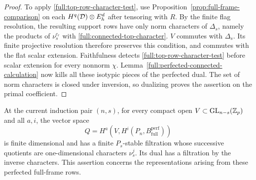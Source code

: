 \begin{proof}
To apply \eqref{full:top-row-character-test}, use
Proposition~\ref{prop:full-frame-comparison} on each
$H^q(\mathcal D)\otimes E_h^d$ after tensoring with $R$.
By the finite flag resolution, the resulting support rows
have only norm characters of $\Delta_s$, namely the products
of $\nu_s^{c_r}$ with \eqref{full:connected-top-character}.
$V$ commutes with $\Delta_s$.
Its finite projective resolution therefore preserves this
condition, and commutes with the flat scalar extension.
Faithfulness detects
\eqref{full:top-row-character-test} before scalar extension
for every nonnorm $\chi$.
Lemma~\ref{full:perfected-connected-calculation} now kills
all these isotypic pieces of the perfected dual.
The set of norm characters is closed under inversion, so
dualizing proves the assertion on the primal coefficient.
\end{proof}

\begin{proposition}
\label{full:perfected-row-characters}
At the current induction pair $(n,s)$, for every compact open
$V\subset\operatorname{GL}_{n-s}(\mathbb Z_p)$ and all $a,i$, the vector space
\[
 Q=H^a\!\left(V,
           H^i(P_n,B_{\mathrm{full}}^{\mathrm{perf}})\right)
\]
is finite dimensional and has a finite $P_s$-stable filtration
whose successive quotients are one-dimensional characters
$\nu_s^j$.
Its dual has a filtration by the inverse characters.
This assertion concerns the representations arising from
these perfected full-frame rows.
\end{proposition}

